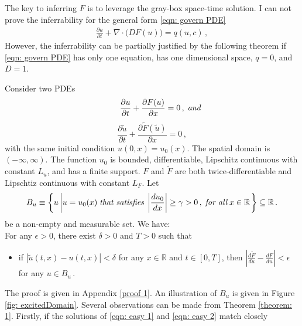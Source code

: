 The key to inferring $F$ is to leverage the gray-box space-time solution.
I can not prove the inferrability for the general form \eqref{eqn: govern PDE}
\begin{equation*}\begin{split}
    \frac{\partial u}{\partial t}+ \nabla \cdot \big( D F(u) \big) = q(u,c)\,,
\end{split}
\end{equation*}
However, the inferrability can be partially justified by the following theorem
if \eqref{eqn: govern PDE} has only one equation, has one dimensional space, $q=0$, and $D=1$.
\begin{theorem}
    Consider two PDEs
    \begin{equation}
        \qquad\frac{\partial u}{\partial t} + \frac{\partial F(u)}{\partial x} = 0\,,\; \emph{and}
        \label{eqn: easy 1}
    \end{equation}
    \begin{equation}
        \frac{\partial \tilde{u}}{\partial t} + \frac{\partial \tilde{F}(\tilde{u})}{\partial x} = 0\,,
        \label{eqn: easy 2}
    \end{equation}
    with the same initial condition $u(0,x) = u_0(x)$. The spatial domain is $(-\infty, \infty)$. 
    The function $u_0$ is bounded, differentiable, 
    Lipschitz continuous with constant $L_u$, 
    and has a finite support. $F$ and $\tilde{F}$ are both twice-differentiable and Lipschtiz 
    continuous with constant $L_F$.
    Let 
    $$
    B_u \equiv \left\{ u\left| u=u_0(x) \; \emph{that satisfies} 
    \;\left|\frac{du_0}{dx}\right|\ge \gamma > 0
    \,,\; \emph{for all} \; x\in \mathbb{R}\right.
    \right\}
    \subseteq \mathbb{R}\,.
    $$
    be a non-empty and measurable set.
    We have:\\
    For any $\epsilon >0$, there exist $\delta>0$ and $T>0$ such that 
    \begin{itemize}
        \item if $|\tilde{u}(t,x)-u(t,x)| < \delta$ for any $x\in \mathbb{R}$ and $t\in [0,T]$, then
              $\left|\frac{d\tilde{F}}{du} - \frac{dF}{du}\right| < 
               \epsilon $ for any $u\in B_u\,.$
    \end{itemize}
    \label{theorem: 1}
\end{theorem}
The proof is given in Appendix \ref{proof 1}.
An illustration of $B_u$ is given in Figure \ref{fig: excitedDomain}.
Several observations can be made from Theorem \ref{theorem: 1}.
Firstly, if the solutions of \eqref{eqn: easy 1} and \eqref{eqn: easy 2} match closely 
